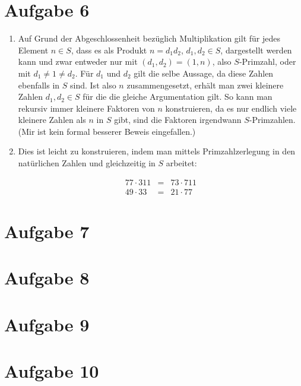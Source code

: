 \section*{Aufgabe 6}
\begin{enumerate}[(1)]
\item Auf Grund der Abgeschlossenheit bezüglich Multiplikation gilt für jedes Element $n \in S$, dass es als Produkt $n = d_1 d_2$, $d_1, d_2 \in S$, 
dargestellt werden kann und zwar entweder nur mit $(d_1, d_2) = (1, n)$, also $S$-Primzahl, oder mit $d_1 \neq 1 \neq d_2$. Für $d_1$ und $d_2$ gilt die selbe Aussage,
da diese Zahlen ebenfalls in $S$ sind. Ist also $n$ zusammengesetzt, erhält man zwei kleinere Zahlen $d_1, d_2 \in S$ für die die gleiche Argumentation gilt. So kann man
rekursiv immer kleinere Faktoren von $n$ konstruieren, da es nur endlich viele kleinere Zahlen als $n$ in $S$ gibt, sind die Faktoren irgendwann $S$-Primzahlen.
(Mir ist kein formal besserer Beweis eingefallen.)

\item Dies ist leicht zu konstruieren, indem man mittels Primzahlzerlegung in den natürlichen Zahlen und gleichzeitig in $S$ arbeitet:

\begin{eqnarray}  7 7 \cdot 3 11 & =& 7 3 \cdot 7 11 \\ 49 \cdot 33 &=& 21 \cdot 77  \end{eqnarray}

\end{enumerate}


\section*{Aufgabe 7}

\section*{Aufgabe 8}

\section*{Aufgabe 9}

\section*{Aufgabe 10}

